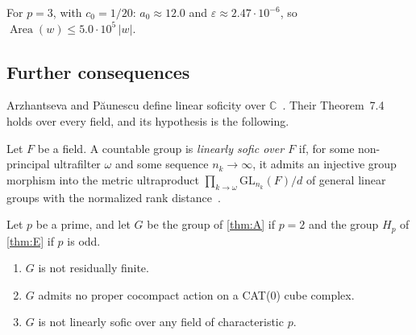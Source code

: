 \documentclass[11pt]{article}
\theoremstyle{definition}
\theoremstyle{plain}
\newcommand{\C}{\mathbb{C}}
\newcommand{\eps}{\varepsilon}
\newcommand{\Area}{\operatorname{Area}}
\begin{document}
For $p=3$, with $c_0=1/20$: $a_0\approx12.0$ and $\eps\approx2.47\cdot10^{-6}$, so $\Area(w)\le5.0\cdot10^5\,|w|$.

\subsection{Further consequences}

Arzhantseva and P\u{a}unescu define linear soficity over $\C$~\cite[Def.~4.1]{AP2017}. Their Theorem~7.4 holds over every field, and its hypothesis is the following.

\begin{definition}\label{def:linsofic}
Let $F$ be a field. A countable group is \emph{linearly sofic over $F$} if, for some non-principal ultrafilter $\omega$ and some sequence $n_k\to\infty$, it admits an injective group morphism into the metric ultraproduct $\prod_{k\to\omega}\mathrm{GL}_{n_k}(F)/d$ of general linear groups with the normalized rank distance~\cite[Defs.~2.3 and~2.5]{AP2017}.
\end{definition}

\begin{corollary}\label{cor:dfcons}
Let $p$ be a prime, and let $G$ be the group of \cref{thm:A} if $p=2$ and the group $H_p$ of \cref{thm:E} if $p$ is odd.
\begin{enumerate}[label=\textup{(\alph*)},itemsep=0pt]
\item $G$ is not residually finite.
\item $G$ admits no proper cocompact action on a CAT(0) cube complex.
\item $G$ is not linearly sofic over any field of characteristic $p$.
\end{enumerate}
\end{corollary}
\end{document}
